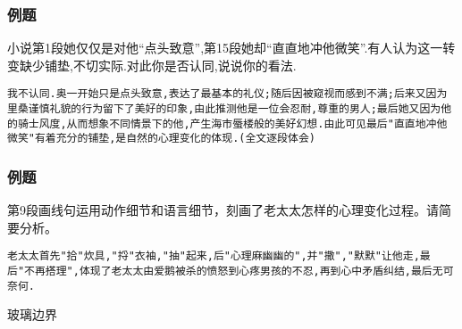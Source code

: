 \documentclass{ctexart}
\newcommand{\nm}{\normalsize}
\renewcommand{\\}{\par}
\begin{document}
\subsubsection{例题}
\\小说第1段她仅仅是对他``点头致意'',第15段她却``直直地冲他微笑''.有人认为这一转变缺少铺垫,不切实际.对此你是否认同,说说你的看法. 
\\ \texttt{我不认同.奥一开始只是点头致意,表达了最基本的礼仪;随后因被窥视而感到不满;后来又因为里桑谨慎礼貌的行为留下了美好的印象,由此推测他是一位会忍耐,尊重的男人;最后她又因为他的骑士风度,从而想象不同情景下的他,产生海市蜃楼般的美好幻想.由此可见最后"直直地冲他微笑"有着充分的铺垫,是自然的心理变化的体现.(全文逐段体会)}
\subsubsection{例题}
\\第9段画线句运用动作细节和语言细节，刻画了老太太怎样的心理变化过程。请简要分析。
\\ \texttt{老太太首先"拾"炊具,"捋"衣袖,"抽"起来,后"心理麻幽幽的",并"撒","默默"让他走,最后"不再搭理",体现了老太太由爱鹅被杀的愤怒到心疼男孩的不忍,再到心中矛盾纠结,最后无可奈何.}
\nm \fangsong 
\\\centerline{玻璃边界}
\end{document}
